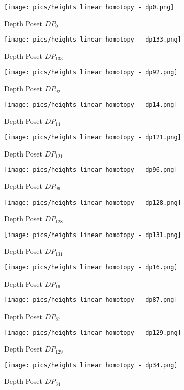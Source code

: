 \documentclass{article}
\begin{document}
\begin{figure}[h]
    \centering
    \texttt{[image: pics/heights linear homotopy - dp0.png]}
    \caption{Depth Poset $DP_{0}$}
    \label{fig:dp0}
\end{figure}
\begin{figure}[h]
    \centering
    \texttt{[image: pics/heights linear homotopy - dp133.png]}
    \caption{Depth Poset $DP_{133}$}
    \label{fig:dp133}
\end{figure}
\begin{figure}[h]
    \centering
    \texttt{[image: pics/heights linear homotopy - dp92.png]}
    \caption{Depth Poset $DP_{92}$}
    \label{fig:dp92}
\end{figure}
\begin{figure}[h]
    \centering
    \texttt{[image: pics/heights linear homotopy - dp14.png]}
    \caption{Depth Poset $DP_{14}$}
    \label{fig:dp14}
\end{figure}
\begin{figure}[h]
    \centering
    \texttt{[image: pics/heights linear homotopy - dp121.png]}
    \caption{Depth Poset $DP_{121}$}
    \label{fig:dp121}
\end{figure}
\begin{figure}[h]
    \centering
    \texttt{[image: pics/heights linear homotopy - dp96.png]}
    \caption{Depth Poset $DP_{96}$}
    \label{fig:dp96}
\end{figure}
\begin{figure}[h]
    \centering
    \texttt{[image: pics/heights linear homotopy - dp128.png]}
    \caption{Depth Poset $DP_{128}$}
    \label{fig:dp128}
\end{figure}
\begin{figure}[h]
    \centering
    \texttt{[image: pics/heights linear homotopy - dp131.png]}
    \caption{Depth Poset $DP_{131}$}
    \label{fig:dp131}
\end{figure}
\begin{figure}[h]
    \centering
    \texttt{[image: pics/heights linear homotopy - dp16.png]}
    \caption{Depth Poset $DP_{16}$}
    \label{fig:dp16}
\end{figure}
\begin{figure}[h]
    \centering
    \texttt{[image: pics/heights linear homotopy - dp87.png]}
    \caption{Depth Poset $DP_{87}$}
    \label{fig:dp87}
\end{figure}
\begin{figure}[h]
    \centering
    \texttt{[image: pics/heights linear homotopy - dp129.png]}
    \caption{Depth Poset $DP_{129}$}
    \label{fig:dp129}
\end{figure}
\begin{figure}[h]
    \centering
    \texttt{[image: pics/heights linear homotopy - dp34.png]}
    \caption{Depth Poset $DP_{34}$}
    \label{fig:dp34}
\end{figure}
\end{document}
